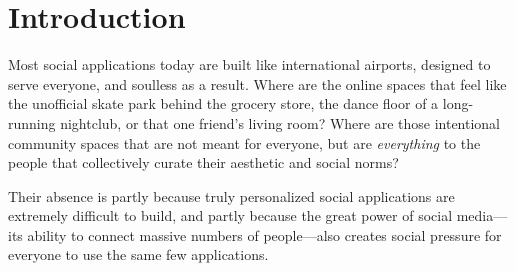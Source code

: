 \section{Introduction}

Most social applications today are built like international airports,
designed to serve everyone, and soulless as a result.
Where are the online spaces that feel like
the unofficial skate park behind the grocery store,
the dance floor of a long-running nightclub,
or that one friend's living room?
Where are those intentional community spaces that
are not meant for everyone,
but are \emph{everything} to the people
that collectively curate their aesthetic and social norms?

Their absence is partly because truly personalized social applications are extremely difficult to build,
and partly because the great power of social media---its
ability to connect massive numbers of people---also
creates social pressure for everyone to use the same few applications.








